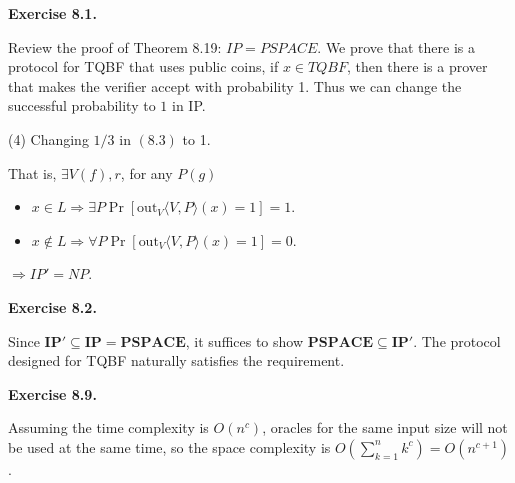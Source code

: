 \documentclass[a4paper]{article}
\newenvironment{exercise}[1]{
	\par
	\noindent\textbf{Exercise #1.}\quad
}{
	\par
	\bigskip
}
\begin{document}
\begin{exercise}{8.1}
	Review the proof of Theorem 8.19: $IP = PSPACE$. We prove that there is a protocol for TQBF that uses public coins, if $x\in TQBF$, then there is a prover that makes the verifier accept with probability 1. Thus we can change the successful probability to $1$ in IP.

	(4) Changing $1/3$ in $(8.3)$ to 1.

	That is, $\exists V (f), r$, for any $P (g)$
	\begin{itemize}
	\item $x \in L \Rightarrow \exists P\Pr[\text{out}_{V}\langle{V,P}\rangle(x) = 1] = 1$. 
	\item $x \not\in L \Rightarrow \forall P \Pr[\text{out}_{V}\langle{V,P}\rangle(x) = 1]  =0$.  
	\end{itemize}
	$\Rightarrow IP' = NP$.
	\end{exercise}

	\begin{exercise}{8.2}
	    Since $\textbf{IP}'\subseteq\textbf{IP}=\textbf{PSPACE}$, it suffices to show $\textbf{PSPACE}\subseteq\textbf{IP}'$.
	    The protocol designed for TQBF naturally satisfies the requirement.
	\end{exercise}

	\begin{exercise}{8.9}
	Assuming the time complexity is $O(n^c)$, oracles for the same input size will not be used at the same time, so the space complexity is $O(\sum_{k=1}^n k^c)=O(n^{c+1})$.
	\end{exercise}
	
\end{document}
